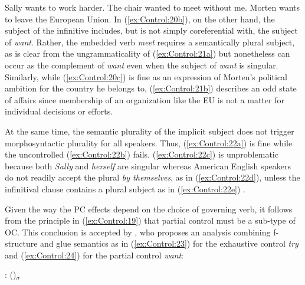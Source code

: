 \documentclass[output=paper,hidelinks]{langscibook}
\begin{document}
\ea\label{ex:Control:20}
\ea\label{ex:Control:20a} Sally wants to work harder.
\ex\label{ex:Control:20b} The chair wanted to meet without me.
\ex\label{ex:Control:20c} Morten wants to leave the European Union.
\z\z
In (\ref{ex:Control:20b}), on the other hand, the subject of the infinitive includes, but is not simply coreferential with, the subject of \emph{want}. Rather, the embedded verb \emph{meet} requires a semantically plural subject, as is clear from the ungrammaticality of (\ref{ex:Control:21a}) but nonetheless can occur as the complement of \emph{want} even when the subject of \emph{want} is singular. Similarly, while (\ref{ex:Control:20c}) is fine as an expression of Morten's political ambition for the country he belongs to, (\ref{ex:Control:21b}) describes an odd state of affairs since membership of an organization like the EU is not a matter for individual decisions or efforts.

\ea\label{ex:Control:21}
\z\z
At the same time, the semantic plurality of the implicit subject does not trigger morphosyntactic plurality for all speakers. Thus, (\ref{ex:Control:22a}) is fine while the uncontrolled (\ref{ex:Control:22b}) fails. (\ref{ex:Control:22c}) is unproblematic because both \emph{Sally} and \emph{herself} are singular whereas American English speakers do not readily accept the plural \emph{by themselves}, as in (\ref{ex:Control:22d}), unless the infinitival clause contains a plural subject as in (\ref{ex:Control:22e}) \citep[161]{Landau2013}.

\ea\label{ex:Control:22}
\z\z

Given the way the PC effects depend on the choice of governing verb, it follows from the principle in (\ref{ex:Control:19}) that partial control must be a sub-type of OC. This conclusion is accepted by \citet{Asudeh05cont}, who proposes an analysis combining f-structure and glue semantics as in (\ref{ex:Control:23}) for the exhaustive control \emph{try} and (\ref{ex:Control:24}) for the partial control \emph{want}:

\ea\label{ex:Control:23}
 : (\UP\SUBJ)$_\sigma$ \linimp [(\UP\XCOMP\SUBJ)$_\sigma$ \linimp (\UP\XCOMP)$_\sigma$] \linimp \UPS
\z
\end{document}
